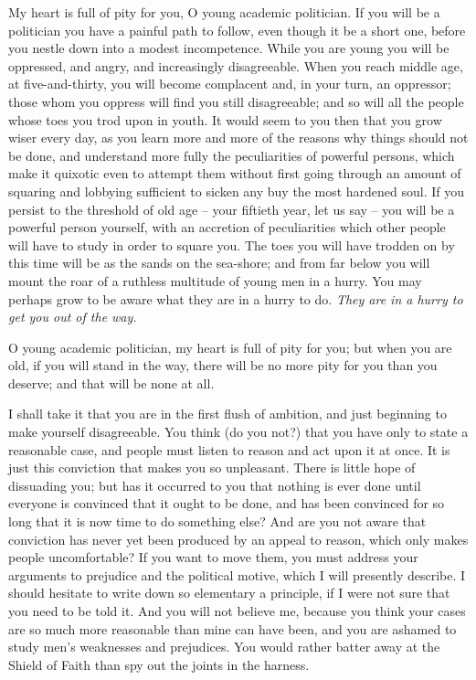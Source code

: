 \documentclass[12pt, oneside, b5paper]{memoir}
\begin{document}
My heart is full of pity for you, O young academic politician. If you will be a politician you have a painful path to follow, even though it be a short one, before you nestle down into a modest incompetence. While you are young you will be oppressed, and angry, and increasingly disagreeable. When you reach middle age, at five-and-thirty, you will become complacent and, in your turn, an oppressor; those whom you oppress will find you still disagreeable; and so will all the people whose toes you trod upon in youth. It would seem to you then that you grow wiser every day, as you learn more and more of the reasons why things should not be done, and understand more fully the peculiarities of powerful persons, which make it quixotic even to attempt them without first going through an amount of squaring and lobbying sufficient to sicken any buy the most hardened soul. If you persist to the threshold of old age -- your fiftieth year, let us say -- you will be a powerful person yourself, with an accretion of peculiarities which other people will have to study in order to square you. The toes you will have trodden on by this time will be as the sands on the sea-shore; and from far below you will mount the roar of a ruthless multitude of young men in a hurry. You may perhaps grow to be aware what they are in a hurry to do. \textit{They are in a hurry to get you out of the way.}

O young academic politician, my heart is full of pity for you; but when you are old, if you will stand in the way, there will be no more pity for you than you deserve; and that will be none at all.

I shall take it that you are in the first flush of ambition, and just beginning to make yourself disagreeable. You think (do you not?) that you have only to state a reasonable case, and people must listen to reason and act upon it at once. It is just this conviction that makes you so unpleasant. There is little hope of dissuading you; but has it occurred to you that nothing is ever done until everyone is convinced that it ought to be done, and has been convinced for so long that it is now time to do something else? And are you not aware that conviction has never yet been produced by an appeal to reason, which only makes people uncomfortable? If you want to move them, you must address your arguments to prejudice and the political motive, which I will presently describe. I should hesitate to write down so elementary a principle, if I were not sure that you need to be told it. And you will not believe me, because you think your cases are so much more reasonable than mine can have been, and you are ashamed to study men's weaknesses and prejudices. You would rather batter away at the Shield of Faith than spy out the joints in the harness.
\end{document}
